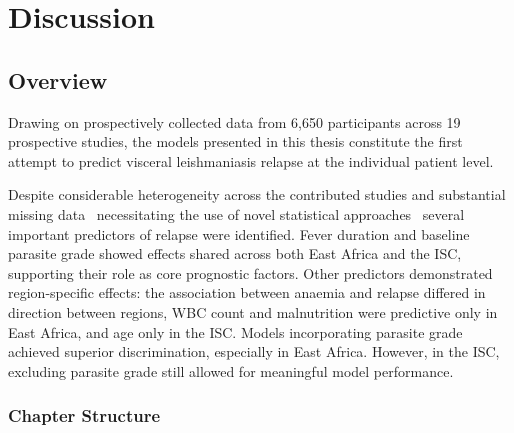 \chapter{\label{ch:7-discussion}Discussion}
\minitoc{}

\section{Overview}



Drawing on prospectively collected data from 6,650 participants across 19 prospective studies, the models presented in this thesis constitute the first attempt to predict visceral leishmaniasis relapse at the individual patient level.

Despite considerable heterogeneity across the contributed studies and substantial missing data \textemdash\ necessitating the use of novel statistical approaches \textemdash\ several important predictors of relapse were identified. Fever duration and baseline parasite grade showed effects shared across both East Africa and the ISC, supporting their role as core prognostic factors. Other predictors demonstrated region-specific effects: the association between anaemia and relapse differed in direction between regions, WBC count and malnutrition were predictive only in East Africa, and age only in the ISC. Models incorporating parasite grade achieved superior discrimination, especially in East Africa. However, in the ISC, excluding parasite grade still allowed for meaningful model performance.

\subsection{Chapter Structure}

